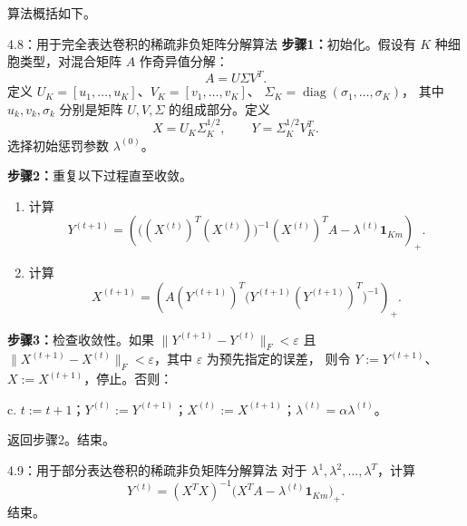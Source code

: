 算法概括如下。
\begin{bookalgorithm}{4.8：用于完全表达卷积的稀疏非负矩阵分解算法}
\textbf{步骤1：}初始化。假设有 $K$ 种细胞类型，对混合矩阵 $A$ 作奇异值分解：
\begin{equation}
A=U\Sigma V^T.\tag{4.266}
\end{equation}
定义 $U_K=[u_1,\ldots,u_K]$、$V_K=[v_1,\ldots,v_K]$、
$\Sigma_K=\operatorname{diag}(\sigma_1,\ldots,\sigma_K)$，
其中 $u_k,v_k,\sigma_k$ 分别是矩阵 $U,V,\Sigma$ 的组成部分。定义
\begin{equation}
X=U_K\Sigma_K^{1/2},\qquad Y=\Sigma_K^{1/2}V_K^T.\tag{4.267}
\end{equation}
选择初始惩罚参数 $\lambda^{(0)}$。

\textbf{步骤2：}重复以下过程直至收敛。
\begin{enumerate}[label=\alph*.]
\item 计算
\begin{equation}
Y^{(t+1)}=\left(
\bigl((X^{(t)})^T(X^{(t)})\bigr)^{-1}(X^{(t)})^TA-\lambda^{(t)}\mathbf1_{Km}
\right)_+.\tag{4.268}
\end{equation}
\item 计算
\begin{equation}
X^{(t+1)}=\left(
A(Y^{(t+1)})^T\bigl(Y^{(t+1)}(Y^{(t+1)})^T\bigr)^{-1}
\right)_+.\tag{4.269}
\end{equation}
\end{enumerate}
\textbf{步骤3：}检查收敛性。如果 $\|Y^{(t+1)}-Y^{(t)}\|_F<\varepsilon$ 且
$\|X^{(t+1)}-X^{(t)}\|_F<\varepsilon$，其中 $\varepsilon$ 为预先指定的误差，
则令 $Y:=Y^{(t+1)}$、$X:=X^{(t+1)}$，停止。否则：

\noindent c. $t:=t+1$；$Y^{(t)}:=Y^{(t+1)}$；$X^{(t)}:=X^{(t+1)}$；$\lambda^{(t)}=\alpha\lambda^{(t)}$。

返回步骤2。结束。
\end{bookalgorithm}

\begin{bookalgorithm}{4.9：用于部分表达卷积的稀疏非负矩阵分解算法}
对于 $\lambda^1,\lambda^2,\ldots,\lambda^T$，计算
\begin{equation}
Y^{(t)}=(X^TX)^{-1}\bigl(X^TA-\lambda^{(t)}\mathbf1_{Km}\bigr)_+.\tag{4.270}
\end{equation}
结束。
\end{bookalgorithm}

